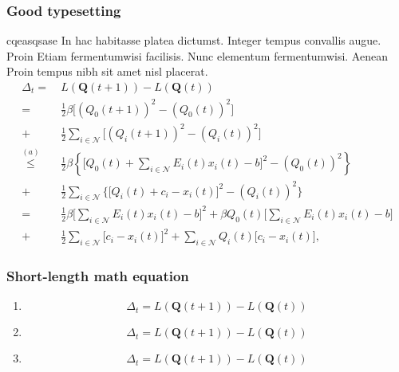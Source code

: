 \documentclass{article}
\begin{document}
\begin{homeworkProblem}
\subsubsection{Good typesetting}

cqeasqsase In hac habitasse platea dictumst. Integer tempus convallis augue. Proin Etiam fermentumwisi facilisis. Nunc elementum fermentumwisi. Aenean  Proin tempus nibh sit amet nisl placerat.
\begin{equation*}
	\begin{aligned}
		\Delta_{t} 
		= &~L ( \boldsymbol{Q}(t+1) ) - L( \boldsymbol{Q}(t) ) \\
		= &~\frac{1}{2} \beta \Big[ (Q_{0}(t+1))^{2}  - (Q_{0}(t))^{2} \Big] \\
		+ &~\frac{1}{2} \sum_{i \in \mathcal{N}} \Big[ (Q_{i}(t+1))^{2} - (Q_{i}(t))^{2} \Big] \\ 
		\overset{(a)}{\le} &~\frac{1}{2} \beta \left\{ \Big[ Q_{0}(t) + \sum_{i \in \mathcal{N}} E_{i}(t) x_{i}(t) - b \Big]^{2} \!\!\!- (Q_{0}(t))^{2} \right\} \\
		+ &~\frac{1}{2} \sum_{i \in \mathcal{N}} \Big\{ \Big[ Q_{i}(t) + c_{i} - x_{i}(t) \Big]^{2} \!\!\!- (Q_{i}(t))^{2} \Big\} \\
		= &~\frac{1}{2} \beta \Big[ \sum_{i \in \mathcal{N}} E_{i}(t) x_{i}(t) - b  \Big]^{2} + \beta Q_{0}(t) \Big[ \sum_{i \in \mathcal{N}} E_{i}(t) x_{i}(t)  - b \Big] \\
		+ &~\frac{1}{2} \sum_{i \in \mathcal{N}} \Big[ c_{i} - x_{i}(t) \Big]^{2} + \sum_{i \in \mathcal{N}} Q_{i}(t) \Big[  c_{i} - x_{i}(t) \Big],
	\end{aligned}
\end{equation*}

\subsubsection{Short-length math equation}

\begin{enumerate}

\item
\[ 
	\Delta_{t} = L ( \boldsymbol{Q}(t+1) ) - L( \boldsymbol{Q}(t) )
\]

\item
$$
	\Delta_{t} = L ( \boldsymbol{Q}(t+1) ) - L( \boldsymbol{Q}(t) )
$$

\item
\begin{equation}
	\Delta_{t} = L ( \boldsymbol{Q}(t+1) ) - L( \boldsymbol{Q}(t) )
\end{equation}

\end{enumerate}

\end{homeworkProblem}
\end{document}
